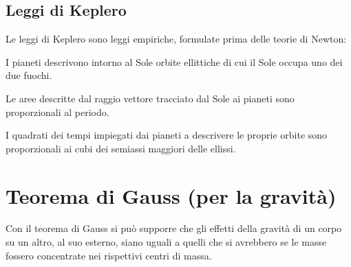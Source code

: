 \subsection{Leggi di Keplero}
Le leggi di Keplero sono leggi empiriche, formulate prima delle
teorie di Newton:
\begin{legge}
I pianeti descrivono intorno al Sole orbite ellittiche di cui il Sole occupa uno dei due fuochi. \end{legge}
\begin{legge}
 Le aree descritte dal raggio vettore tracciato dal Sole ai pianeti sono proporzionali al periodo.
\end{legge}
\begin{legge}
I quadrati dei tempi impiegati dai pianeti a descrivere le proprie orbite sono proporzionali ai cubi dei semiassi maggiori delle ellissi.
\end{legge}


\section{Teorema di Gauss (per la gravità)}
Con il teorema di Gauss si può supporre che gli effetti della
gravità di un corpo su un altro, al suo esterno, siano uguali a
quelli che si avrebbero se le masse fossero concentrate nei rispettivi centri di massa.



